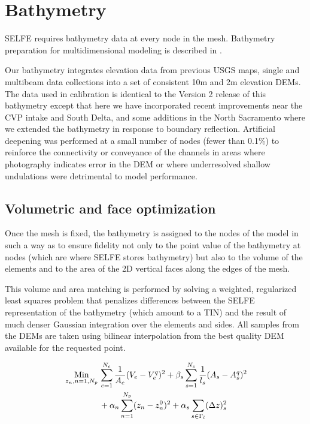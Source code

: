 \section{Bathymetry} 
SELFE requires bathymetry data at every node in the mesh. Bathymetry preparation for multidimensional modeling is described in \cite{Wang12}. 

Our bathymetry integrates elevation data from previous USGS maps, single and multibeam data collections into a set of consistent 10m and 2m elevation DEMs. 
The data used in calibration is identical to the Version 2 release of this bathymetry except that here 
we have incorporated recent improvements near the CVP intake and South Delta, 
and some additions in the North Sacramento where we extended the bathymetry in response to boundary reflection. Artificial deepening was performed at a small number of nodes 
(fewer than 0.1\%) to reinforce the connectivity or conveyance of the channels in areas where photography indicates error in the 
DEM or where underresolved shallow undulations were detrimental to model performance.




\subsection{Volumetric and face optimization}

Once the mesh is fixed, the bathymetry is assigned to the nodes of the model
 in such a way as to ensure fidelity not only to the point value 
of the bathymetry at nodes (which are where SELFE stores  bathymetry) 
but also to the volume of the elements and to the area of the 2D vertical faces 
along the edges of the mesh. 

This volume and area matching is performed by solving a weighted, regularized 
least squares problem that penalizes differences between the SELFE representation of the bathymetry
(which amount to a TIN) and the result of much denser Gaussian integration over the elements and sides.
All samples from the DEMs are taken using bilinear interpolation from the best quality DEM available for the 
requested point.

\begin{align}
   &\operatorname*{Min}_{z_n, n=1,N_p}
   \begin{aligned}[t]
      &\sum_{e=1}^{N_e} \frac{1}{A_e}(V_e - V_e^q)^2 + \beta_s \sum_{s=1}^{N_s} \frac{1}{l_s}(A_s-A_s^q)^2 \\
      & + \alpha_n \sum_{n=1}^{N_p} (z_n-z_n^{0})^2 + \alpha_s \sum_{s \in \Gamma_{l}} (\Delta z)_s^2
   \end{aligned} \notag \\
\end{align}

